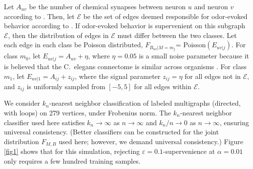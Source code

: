 \documentclass{article}
\newcommand{\eps}{\varepsilon}
\providecommand{\mc}[1]{\mathcal{#1}}
\begin{document}
Let $A_{uv}$ be the number of chemical synapses between neuron $u$ and neuron $v$ according to \cite{VarshneyChklovskii09}.  Then, let $\mc{E}$ be the set of edges deemed responsible for odor-evoked behavior according to \cite{ChalasaniBargmann07}.  If odor-evoked behavior is supervenient on this subgraph $\mc{E}$, then the distribution of edges in $\mc{E}$ must differ between the two classes. Let each edge in each class be Poisson distributed,  $F_{B_{uv}|M=m_j}$= Poisson$(E_{uv|j})$.  For class $m_0$, let $E_{uv|j}=A_{uv}+\eta$,  where $\eta=0.05$ is a small noise parameter because it is believed that the C.~elegans connectome is similar across organisms \cite{Durbin87}. For class $m_1$, let $E_{uv|1}=A_{ij}+z_{ij}$, where the signal parameter $z_{ij}=\eta$ for all edges not in $\mc{E}$, and $z_{ij}$ is uniformly sampled from $[-5,5]$ for all edges within $\mc{E}$. 



We consider $k_n$-nearest neighbor classification of labeled multigraphs (directed, with loops) on 279 vertices, under Frobenius norm. The $k_n$-nearest neighbor classifier used here satisfies $k_n \rightarrow \infty$ as $n \rightarrow \infty$ and $k_n/n \rightarrow 0$ as $n \rightarrow \infty$, ensuring universal consistency. (Better classifiers can be constructed for the joint distribution $F_{M,B}$ used here; however, we demand universal consistency.)  Figure \ref{fig1} shows that for this simulation, rejecting $\eps=0.1$-supervenience at $\alpha=0.01$ only requires a few hundred training samples.


\end{document}
